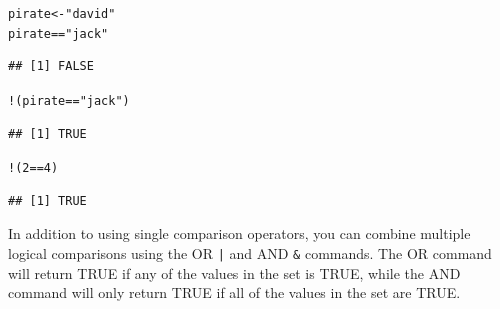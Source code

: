 \documentclass{tufte-book}\usepackage[]{graphicx}\usepackage[]{color}
\makeatletter
\newcommand{\hlnum}[1]{\textcolor[rgb]{0.686,0.059,0.569}{#1}}%
\newcommand{\hlstr}[1]{\textcolor[rgb]{0.192,0.494,0.8}{#1}}%
\newcommand{\hlopt}[1]{\textcolor[rgb]{0,0,0}{#1}}%
\newcommand{\hlstd}[1]{\textcolor[rgb]{0.345,0.345,0.345}{#1}}%
\newcommand{\hlkwb}[1]{\textcolor[rgb]{0.69,0.353,0.396}{#1}}%
\newenvironment{kframe}{%
 \def\at@end@of@kframe{}%
 \ifinner\ifhmode%
  \def\at@end@of@kframe{\end{minipage}}%
  \begin{minipage}{\columnwidth}%
 \fi\fi%
 \def\FrameCommand##1{\hskip\@totalleftmargin \hskip-\fboxsep
 \colorbox{shadecolor}{##1}\hskip-\fboxsep
     \hskip-\linewidth \hskip-\@totalleftmargin \hskip\columnwidth}%
 \MakeFramed {\advance\hsize-\width
   \@totalleftmargin\z@ \linewidth\hsize
   \@setminipage}}%
 {\par\unskip\endMakeFramed%
 \at@end@of@kframe}
\newenvironment{knitrout}{}{} %
\makeatother
\begin{document}
\begin{footnotesize}
\begin{footnotesize}
\begin{knitrout}
\color{fgcolor}\begin{kframe}
\begin{alltt}
\hlstd{pirate} \hlkwb{<-} \hlstr{"david"}
\hlstd{pirate} \hlopt{==} \hlstr{"jack"}
\end{alltt}
\begin{verbatim}
## [1] FALSE
\end{verbatim}
\begin{alltt}
\hlopt{!}\hlstd{(pirate} \hlopt{==} \hlstr{"jack"}\hlstd{)}
\end{alltt}
\begin{verbatim}
## [1] TRUE
\end{verbatim}
\begin{alltt}
\hlopt{!}\hlstd{(}\hlnum{2} \hlopt{==} \hlnum{4}\hlstd{)}
\end{alltt}
\begin{verbatim}
## [1] TRUE
\end{verbatim}
\end{kframe}
\end{knitrout}
\end{footnotesize}




In addition to using single comparison operators, you can combine multiple logical comparisons using the OR \texttt{|} and AND \texttt{\&} commands. The OR command will return TRUE if any of the values in the set is TRUE, while the AND command will only return TRUE if all of the values in the set are TRUE.


\end{footnotesize}
\end{document}
